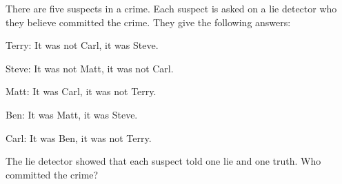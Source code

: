 There are five suspects in a crime. Each suspect is asked on a lie detector who they believe committed the crime. They give the following answers:



Terry: It was not Carl, it was Steve.



Steve: It was not Matt, it was not Carl.



Matt: It was Carl, it was not Terry.



Ben: It was Matt, it was Steve.



Carl: It was Ben, it was not Terry.



The lie detector showed that each suspect told one lie and one truth. Who committed the crime?
